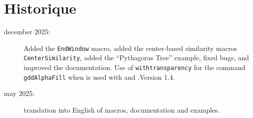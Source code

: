 \documentclass[a4paper,english]{article}
\begin{document}
\newpage

\section{Historique}
\begin{description}
  \item[december 2025:] Added the \lstinline+EndWindow+ macro, added the
  center-based similarity macros \lstinline+CenterSimilarity+, added the
  “Pythagoras Tree” example, fixed bugs, and improved the documentation. 
  Use of \lstinline+withtransparency+ for the command \lstinline+gddAlphaFill+ when \mpgeomdd is used with  and .Version 1.4.
  \item[may 2025:] translation into English of macros, documentation and examples.
\end{description}

\printbibliography
{}%
\printindex
{}%
\end{document}
